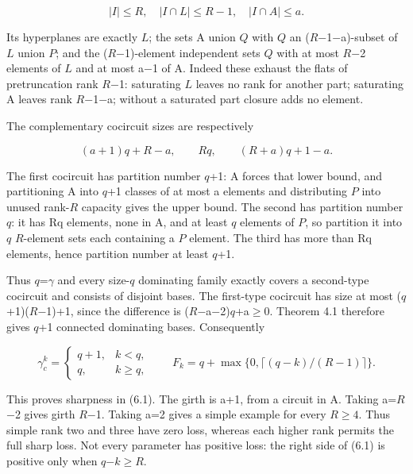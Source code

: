 \documentclass[11pt]{article}
\begin{document}
\[
|I|\le R,\quad |I\cap L|\le R-1,\quad |I\cap A|\le a.
\]

Its hyperplanes are exactly \(L\); the sets A union \(Q\) with \(Q\) an (\(R\)\ensuremath{-}1\ensuremath{-}a)-subset of \(L\) union \(P\); and the (\(R\)\ensuremath{-}1)-element independent sets \(Q\) with at most \(R\)\ensuremath{-}2 elements of \(L\) and at most a\ensuremath{-}1 of A. Indeed these exhaust the flats of pretruncation rank \(R\)\ensuremath{-}1: saturating \(L\) leaves no rank for another part; saturating A leaves rank \(R\)\ensuremath{-}1\ensuremath{-}a; without a saturated part closure adds no element.

The complementary cocircuit sizes are respectively

\[
(a+1)q+R-a,\qquad Rq,\qquad (R+a)q+1-a.
\]

The first cocircuit has partition number \(q\)+1: A forces that lower bound, and partitioning A into \(q\)+1 classes of at most a elements and distributing \(P\) into unused rank-\(R\) capacity gives the upper bound. The second has partition number \(q\): it has Rq elements, none in A, and at least \(q\) elements of \(P\), so partition it into \(q\) \(R\)-element sets each containing a \(P\) element. The third has more than Rq elements, hence partition number at least \(q\)+1.

Thus \(q\)=\(\gamma\) and every size-\(q\) dominating family exactly covers a second-type cocircuit and consists of disjoint bases. The first-type cocircuit has size at most (\(q\)+1)(\(R\)\ensuremath{-}1)+1, since the difference is (\(R\)\ensuremath{-}a\ensuremath{-}2)\(q\)+a\(\ge\)0. Theorem 4.1 therefore gives \(q\)+1 connected dominating bases. Consequently

\[
\gamma_c^k=\begin{cases}q+1,&k<q,\\q,&k\ge q,\end{cases}
\qquad F_k=q+\max\{0,\lceil(q-k)/(R-1)\rceil\}.       \tag{6.2}
\]

This proves sharpness in (6.1). The girth is a+1, from a circuit in A. Taking a=\(R\)\ensuremath{-}2 gives girth \(R\)\ensuremath{-}1. Taking a=2 gives a simple example for every \(R\ge4\). Thus simple rank two and three have zero loss, whereas each higher rank permits the full sharp loss. Not every parameter has positive loss: the right side of (6.1) is positive only when \(q\)\ensuremath{-}\(k\)\(\ge\)\(R\).
\end{document}
